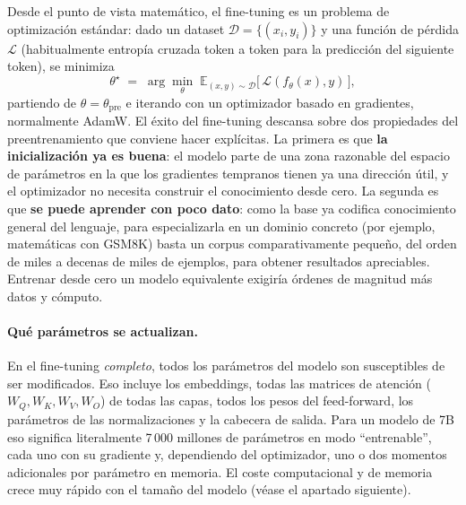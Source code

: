 \documentclass[11pt,a4paper]{article}
\begin{document}
Desde el punto de vista matemático, el fine-tuning es un problema de optimización estándar: dado un dataset $\mathcal{D} = \{(x_i, y_i)\}$ y una función de pérdida $\mathcal{L}$ (habitualmente entropía cruzada token a token para la predicción del siguiente token), se minimiza
\[
\theta^{\star} \;=\; \arg\min_{\theta} \; \mathbb{E}_{(x,y)\sim \mathcal{D}}\big[\, \mathcal{L}(f_\theta(x), y)\,\big],
\]
partiendo de $\theta = \theta_{\text{pre}}$ e iterando con un optimizador basado en gradientes, normalmente AdamW. El éxito del fine-tuning descansa sobre dos propiedades del preentrenamiento que conviene hacer explícitas. La primera es que \textbf{la inicialización ya es buena}: el modelo parte de una zona razonable del espacio de parámetros en la que los gradientes tempranos tienen ya una dirección útil, y el optimizador no necesita construir el conocimiento desde cero. La segunda es que \textbf{se puede aprender con poco dato}: como la base ya codifica conocimiento general del lenguaje, para especializarla en un dominio concreto (por ejemplo, matemáticas con GSM8K) basta un corpus comparativamente pequeño, del orden de miles a decenas de miles de ejemplos, para obtener resultados apreciables. Entrenar desde cero un modelo equivalente exigiría órdenes de magnitud más datos y cómputo.

\paragraph{Qué parámetros se actualizan.} En el fine-tuning \emph{completo}, todos los parámetros del modelo son susceptibles de ser modificados. Eso incluye los embeddings, todas las matrices de atención ($W_Q, W_K, W_V, W_O$) de todas las capas, todos los pesos del feed-forward, los parámetros de las normalizaciones y la cabecera de salida. Para un modelo de 7B eso significa literalmente 7\,000 millones de parámetros en modo ``entrenable'', cada uno con su gradiente y, dependiendo del optimizador, uno o dos momentos adicionales por parámetro en memoria. El coste computacional y de memoria crece muy rápido con el tamaño del modelo (véase el apartado siguiente).
\end{document}
